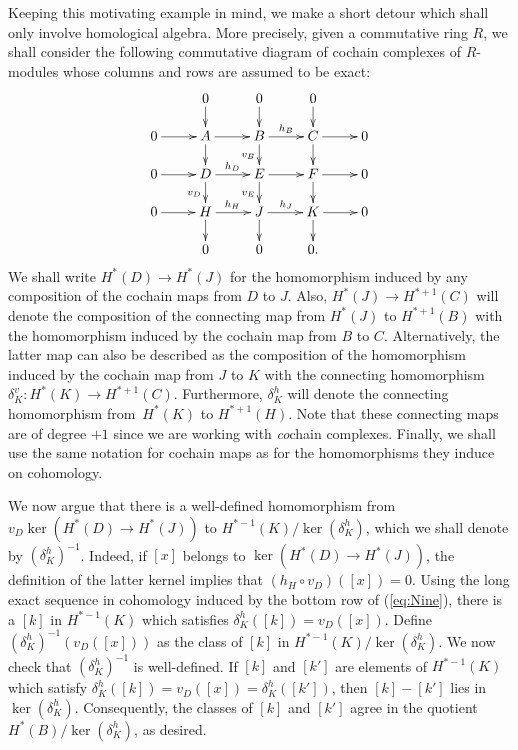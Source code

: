 \documentclass[11pt,a4paper]{amsart}
\theoremstyle{definition}
\begin{document}
\medskip
Keeping this motivating example in mind, we make a short detour which shall only involve homological algebra. More precisely, given a commutative ring $R$, we shall consider the following commutative diagram of cochain complexes of $R$-modules whose columns and rows are assumed to be exact:
\begin{equation}
\label{eq:Nine}
\xymatrix@R0.5cm{
  &0 \ar[d]&  0\ar[d]&  0\ar[d]&  \\
0 \ar[r] &A\ar[d] \ar[r]& B \ar[d]_{v_B}\ar[r]^{h_B}& C \ar[r]\ar[d]& 0 \\
0 \ar[r] &D \ar[r]^{h_D}\ar[d]_{v_D}& E \ar[r]\ar[d]_{v_E}& F \ar[r]\ar[d]& 0 \\
0 \ar[r] &H \ar[r]^{h_H}\ar[d]& J \ar[r]^{h_J}\ar[d]& K \ar[r]\ar[d]& 0  \\
  &0 &  0&  0.& 
}
\end{equation}
We shall write $H^*(D) \to H^*(J)$ for the homomorphism induced by any composition of the cochain maps from $D$ to $J$. Also, $H^*(J) \to H^{*+1}(C)$ will denote the composition of the connecting map from $H^*(J)$ to $H^{*+1}(B)$ with the homomorphism induced by the cochain map from $B$ to $C$. Alternatively, the latter map can also be described as the composition of the homomorphism induced by the cochain map from $J$ to $K$ with the connecting homomorphism $\delta_K^v \colon H^*(K) \to H^{*+1}(C)$. Furthermore, $\delta_K^h$ will denote the connecting homomorphism from~$H^*(K)$ to $H^{*+1}(H)$. Note that these connecting maps are of degree $+1$ since we are working with \emph{co}chain complexes. Finally, we shall use the same notation for cochain maps as for the homomorphisms they induce on cohomology.

We now argue that there is a well-defined homomorphism from $v_D \ker( H^*(D)  \to H^*(J))$ to $H^{*-1}(K)/\ker(\delta_K^h)$, which we shall denote by $(\delta_K^h)^{-1}$. Indeed, if $[x]$ belongs to $\ker( H^*(D)  \to H^*(J))$, the definition of the latter kernel implies that $(h_H \circ v_D)([x])=0$. Using the long exact sequence in cohomology induced by the bottom row of (\ref{eq:Nine}), there is a $[k]$ in $ H^{*-1}(K)$ which satisfies $\delta_K^h([k])=v_D([x])$. Define $(\delta_K^h)^{-1}(v_D([x]))$ as the class of $[k]$ in $H^{*-1}(K)/\ker(\delta_K^h)$. We now check that $(\delta_K^h)^{-1}$ is well-defined. If $[k]$ and $[k']$ are elements of $H^{*-1}(K)$ which satisfy $\delta_K^h([k])=v_D([x])=\delta_K^h([k'])$, then $[k]-[k']$ lies in $\ker(\delta_K^h)$. Consequently, the classes of $[k]$ and $[k']$ agree in the quotient $H^*(B)/\ker(\delta_K^h)$, as desired. 
\end{document}
